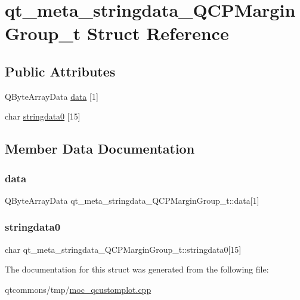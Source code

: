 \hypertarget{structqt__meta__stringdata___q_c_p_margin_group__t}{}\section{qt\+\_\+meta\+\_\+stringdata\+\_\+\+Q\+C\+P\+Margin\+Group\+\_\+t Struct Reference}
\label{structqt__meta__stringdata___q_c_p_margin_group__t}
\subsection*{Public Attributes}
\begin{DoxyCompactItemize}
\item 
Q\+Byte\+Array\+Data \mbox{\hyperlink{structqt__meta__stringdata___q_c_p_margin_group__t_a99abe4f941bb7fbdfd988480fd5e6dc9}{data}} \mbox{[}1\mbox{]}
\item 
char \mbox{\hyperlink{structqt__meta__stringdata___q_c_p_margin_group__t_aea2e8169d7b920f953fc3d240d03082b}{stringdata0}} \mbox{[}15\mbox{]}
\end{DoxyCompactItemize}


\subsection{Member Data Documentation}
\mbox{\label{structqt__meta__stringdata___q_c_p_margin_group__t_a99abe4f941bb7fbdfd988480fd5e6dc9}} 
\subsubsection{\texorpdfstring{data}{data}}
{\footnotesize\ttfamily Q\+Byte\+Array\+Data qt\+\_\+meta\+\_\+stringdata\+\_\+\+Q\+C\+P\+Margin\+Group\+\_\+t\+::data\mbox{[}1\mbox{]}}

\mbox{\label{structqt__meta__stringdata___q_c_p_margin_group__t_aea2e8169d7b920f953fc3d240d03082b}} 
\subsubsection{\texorpdfstring{stringdata0}{stringdata0}}
{\footnotesize\ttfamily char qt\+\_\+meta\+\_\+stringdata\+\_\+\+Q\+C\+P\+Margin\+Group\+\_\+t\+::stringdata0\mbox{[}15\mbox{]}}



The documentation for this struct was generated from the following file\+:\begin{DoxyCompactItemize}
\item 
qtcommons/tmp/\mbox{\hyperlink{moc__qcustomplot_8cpp}{moc\+\_\+qcustomplot.\+cpp}}\end{DoxyCompactItemize}
